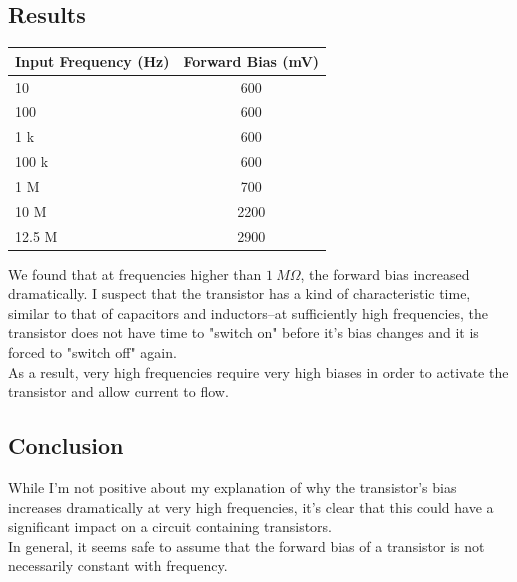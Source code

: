 \documentclass[11pt]{article}
\begin{document}
\subsection{Results}

\begin{center}
    \begin{tabular}[H]{ | l | c | }
        \hline
        Input Frequency (Hz) & Forward Bias (mV) \\ \hline
        10 & 600 \\ \hline
        100 & 600 \\ \hline
        1 k & 600 \\ \hline
        100 k & 600 \\ \hline
        1 M & 700 \\ \hline
        10 M & 2200 \\ \hline
        12.5 M & 2900 \\ \hline
    \end{tabular}
\end{center}

We found that at frequencies higher than $1\ M \Omega$, the forward bias increased dramatically. I suspect that the transistor has a kind of  characteristic time, similar to that of capacitors and inductors--at sufficiently high frequencies, the transistor does not have time to "switch on" before it's bias changes and it is forced to "switch off" again.\\

As a result, very high frequencies require very high biases in order to activate the transistor and allow current to flow.\\

\subsection{Conclusion}

While I'm not positive about my explanation of why the transistor's bias increases dramatically at very high frequencies, it's clear that this could have a significant impact on a circuit containing transistors.\\

In general, it seems safe to assume that the forward bias of a transistor is not necessarily constant with frequency.\\
\end{document}
